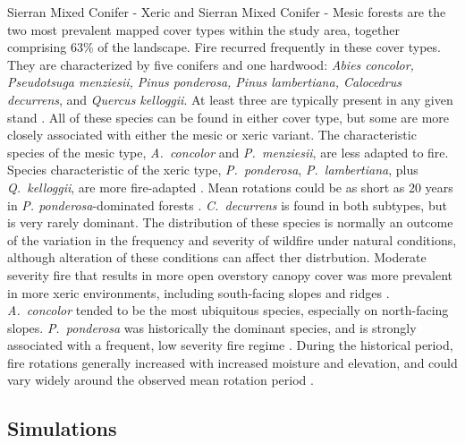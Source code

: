 Sierran Mixed Conifer - Xeric and Sierran Mixed Conifer - Mesic forests are the two most prevalent mapped cover types within the study area, together comprising 63\% of the landscape. Fire recurred frequently in these cover types. They are characterized by five conifers and one hardwood: \emph{Abies concolor, Pseudotsuga menziesii, Pinus ponderosa, Pinus lambertiana, Calocedrus decurrens}, and \emph{Quercus kelloggii}. At least three are typically present in any given stand \citep{Landfire2007}. All of these species can be found in either cover type, but some are more closely associated with either the mesic or xeric variant. The characteristic species of the mesic type, \emph{A.~concolor} and \emph{P.~menziesii}, are less adapted to fire. Species characteristic of the xeric type, \emph{P.~ponderosa}, \emph{P.~lambertiana}, plus \emph{Q.~kelloggii}, are more fire-adapted \citep{Landfire2007}. Mean rotations could be as short as 20 years in \emph{P. ponderosa}-dominated forests \citep{Mallek2013}. \emph{C.~decurrens} is found in both subtypes, but is very rarely dominant. The distribution of these species is normally an outcome of the variation in the frequency and severity of wildfire under natural conditions, although alteration of these conditions can affect ther distrbution. Moderate severity fire that results in more open overstory canopy cover was more prevalent in more xeric environments, including south-facing slopes and ridges \citep{Mallek2013,Safford2014,SNEP1996a,SNEP1996}. \emph{A.~concolor} tended to be the most ubiquitous species, especially on north-facing slopes. \emph{P.~ponderosa} was historically the dominant species, and is strongly associated with a frequent, low severity fire regime \citep{WHR1988,Landfire2007}. During the historical period, fire rotations generally increased with increased moisture and elevation, and could vary widely around the observed mean rotation period \citep{Mallek2013}. 



\subsection*{Simulations}

